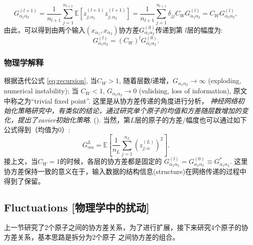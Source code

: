 \begin{equation}
    G_{\alpha_1\alpha_2}^{(l+1)} = 
        \frac{1}{n_{l+1}} \sum_{j=1}^{n_{l+1}} \mathbb{E}[z_{j;\alpha_1}^{(l+1)}z_{j;\alpha_2}^{(l+1)}] 
        = \frac{1}{n_{l+1}}\sum_{j=1}^{n_{l+1}} \delta_{jj}C_W G_{\alpha_1\alpha_2}^{(l)}
        = C_W G_{\alpha_1\alpha_2}^{(l)},
\end{equation}
由此，可以得到由两个输入$(x_{\alpha_1}, x_{\alpha_2})$协方差$G_{\alpha_1\alpha_2}^{(0)}$传递到第
$l$层的幅度为:
\begin{equation}
    G_{\alpha_1\alpha_2}^{(l)} = (C_W)^l G_{\alpha_1\alpha_2}^{(0)}.
    \label{eq:recursion}
\end{equation} 

\subsubsection{物理学解释}
根据迭代公式 \ref{eq:recursion}, 当$C_W > 1$, 随着层数$l$递增，$G_{\alpha_1\alpha_2} \to \infty$ (exploding,
numerical instability); 当 $C_W < 1$, $G_{\alpha_1\alpha_2} \to 0$ (valishing, loss of information), 
原文中称之为``trivial fixed point''. 这里是从协方差传递的角度进行分析， 
\emph{神经网络初始化策略研究中，有类似的结论，通过研究单个原子的均值和方差随层数增加的变化，提出了xavier初始化策略}.
(). 当然，第$L$层的原子的方差/幅度也可以通过如下公式得到（均值为$0$）:
\begin{equation*}
    G_{\alpha\alpha}^L = \mathbb{E} [\frac{1}{n_L} \sum_{j=1}^{n_L}(z_{j;\alpha}^{(L)})^2].
\end{equation*}
接上文，当$C_W=1$的时候，各层的协方差都是固定的 
$G_{\alpha_1\alpha_2}^{(l)} = G_{\alpha_1\alpha_2}^{(0)} \equiv G_{\alpha_1\alpha_2}^*$. 这里
协方差保持一致的意义在于，输入数据的结构信息(structure)在网络传递的过程中得到了保留。

\subsection{Fluctuations [物理学中的扰动]}
上一节研究了$2$个原子之间的协方差关系，为了进行扩展，接下来研究$4$个原子的协方差关系，基本思路是拆分为$2$个原子
之间协方差的组合。